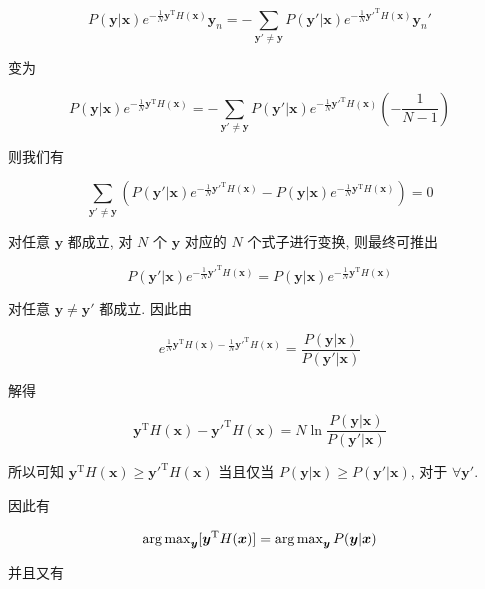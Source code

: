 \documentclass[answers]{exam}  %
\begin{document}
\begin{questions}
\begin{solution}
\begin{enumerate}
            $$
              P(\bm{y}|\bm{x})e^{-\frac{1}{N}\bm{y}^{\mathrm{T}}H(\bm{x})}\bm{y}_{n} = - \sum_{\bm{y}' \neq \bm{y}}P(\bm{y}'|\bm{x})e^{-\frac{1}{N}\bm{y}'^{\mathrm{T}}H(\bm{x})}\bm{y}_{n}'
            $$

            变为

            $$
              P(\bm{y}|\bm{x})e^{-\frac{1}{N}\bm{y}^{\mathrm{T}}H(\bm{x})} = - \sum_{\bm{y}' \neq \bm{y}}P(\bm{y}'|\bm{x})e^{-\frac{1}{N}\bm{y}'^{\mathrm{T}}H(\bm{x})}(-\frac{1}{N-1})
            $$

            则我们有

            $$
              \sum_{\bm{y}' \neq \bm{y}}(P(\bm{y}'|\bm{x})e^{-\frac{1}{N}\bm{y}'^{\mathrm{T}}H(\bm{x})} - P(\bm{y}|\bm{x})e^{-\frac{1}{N}\bm{y}^{\mathrm{T}}H(\bm{x})}) = 0
            $$

            对任意 $\bm{y}$ 都成立, 对 $N$ 个 $\bm{y}$ 对应的 $N$ 个式子进行变换, 则最终可推出

            $$
              P(\bm{y}'|\bm{x})e^{-\frac{1}{N}\bm{y}'^{\mathrm{T}}H(\bm{x})} = P(\bm{y}|\bm{x})e^{-\frac{1}{N}\bm{y}^{\mathrm{T}}H(\bm{x})}
            $$

            对任意 $\bm{y} \neq \bm{y}'$ 都成立. 因此由

            $$
              e^{\frac{1}{N}\bm{y}^{\mathrm{T}}H(\bm{x})-\frac{1}{N}\bm{y}'^{\mathrm{T}}H(\bm{x})} = \frac{P(\bm{y}|\bm{x})}{P(\bm{y}'|\bm{x})}
            $$

            解得

            $$
              \bm{y}^{\mathrm{T}}H(\bm{x})-\bm{y}'^{\mathrm{T}}H(\bm{x}) = N \ln \frac{P(\bm{y}|\bm{x})}{P(\bm{y}'|\bm{x})}
            $$

            所以可知 $\bm{y}^{\mathrm{T}}H(\bm{x}) \ge \bm{y}'^{\mathrm{T}}H(\bm{x})$ 当且仅当 $P(\bm{y}|\bm{x}) \ge P(\bm{y}'|\bm{x})$, 对于 $\forall \bm{y}'$.

            因此有

            $$
              \operatorname{arg\,max}_{\bm{y}}[\bm{y}^{\mathrm{T}}H(\bm{x})] = \operatorname{arg\,max}_{\bm{y}}P(\bm{y}|\bm{x})
            $$

            并且又有


\end{enumerate}
\end{solution}
\end{questions}
\end{document}

